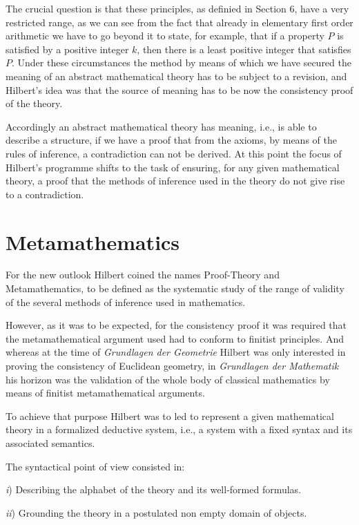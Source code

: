 \documentclass[12pt]{article}
\begin{document}
The crucial question is that these principles, as definied in Section 6, have a very restricted range, as we can see from the fact that already in elementary first order arithmetic we have to go beyond it to state, for example, that if a property $P$ is satisfied by a positive integer $k$, then there is a least positive integer that satisfies $P$. Under these circumstances the method by means of which we have secured the meaning of an abstract mathematical theory has to be subject to a revision, and Hilbert's idea was that the source of meaning has to be now the consistency proof of the theory.

Accordingly an abstract mathematical theory has meaning, i.e., is able to describe a structure, if we have a proof that from the axioms, by means of the rules of inference, a contradiction can not be derived. At this point the focus of Hilbert's programme shifts to the task of ensuring, for any given mathematical theory, a proof that the methods of inference used in the theory do not give rise to a contradiction.

\section{Metamathematics}\normalsize

For the new outlook Hilbert coined the names Proof-Theory and Metamathematics, to be defined as the systematic study of the range of validity of the several methods of inference used in mathematics.

However, as it was to be expected, for the consistency proof it was required that the metamathematical argument used had to conform to finitist principles. And whereas at the time of \emph{Grundlagen der Geometrie} Hilbert was only interested in proving the consistency of Euclidean geometry, in \emph{Grundlagen der Mathematik} his horizon was the validation of the whole body of classical mathematics by means of finitist metamathematical arguments.

To achieve that purpose Hilbert was to led to represent a given mathematical theory in a formalized deductive system, i.e., a system with a fixed syntax and its associated semantics.
 
The syntactical point of view consisted in:

\emph{i}) Describing the alphabet of the theory and its well-formed formulas.

\emph{ii}) Grounding the theory in a postulated non empty domain of objects.
 
\end{document}
